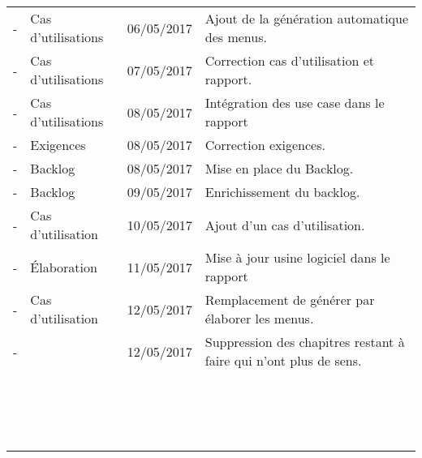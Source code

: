 \begin{tabular}{|c|p{3.5cm}|c|p{9cm}|}
  - & Cas d'utilisations & 06/05/2017 & Ajout de la génération automatique des menus.\\
  - & Cas d'utilisations & 07/05/2017 & Correction cas d'utilisation et rapport.\\
  - & Cas d'utilisations & 08/05/2017 & Intégration des use case dans le rapport\\
  - & Exigences & 08/05/2017 & Correction exigences.\\
  - & Backlog & 08/05/2017 & Mise en place du Backlog.\\
  - & Backlog & 09/05/2017 & Enrichissement du backlog.\\
  - & Cas d'utilisation  & 10/05/2017 & Ajout d'un cas d'utilisation.\\
  - & Élaboration  & 11/05/2017 & Mise à jour usine logiciel dans le rapport\\
  - & Cas d'utilisation  & 12/05/2017 & Remplacement de générer par élaborer les menus.\\
  - & & 12/05/2017 & Suppression des chapitres restant à faire qui n'ont plus de sens.\\
  &&&\\
  &&&\\
  &&&\\
  &&&\\
  &&&\\
  &&&\\
  &&&\\
  &&&\\
  &&&\\
  &&&\\
  &&&\\
  &&&\\
  &&&\\
  &&&\\
  &&&\\
  &&&\\ \hline
\end{tabular}
